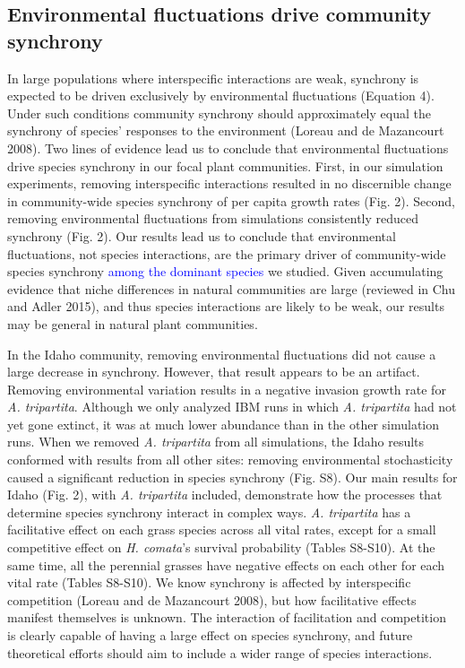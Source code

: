 \documentclass[12pt,]{article}
\begin{document}
\subsection{Environmental fluctuations drive community synchrony}

In large populations where interspecific interactions are weak,
synchrony is expected to be driven exclusively by environmental
fluctuations (Equation 4). Under such conditions community synchrony
should approximately equal the synchrony of species' responses to the
environment (Loreau and {{de Mazancourt}} 2008). Two lines of evidence
lead us to conclude that environmental fluctuations drive species
synchrony in our focal plant communities. First, in our simulation
experiments, removing interspecific interactions resulted in no
discernible change in community-wide species synchrony of per capita
growth rates (Fig. 2). Second, removing environmental fluctuations from
simulations consistently reduced synchrony (Fig. 2). Our results lead us
to conclude that environmental fluctuations, not species interactions,
are the primary driver of community-wide species synchrony
\textcolor{blue}{among the dominant species} we studied. Given
accumulating evidence that niche differences in natural communities are
large (reviewed in Chu and Adler 2015), and thus species interactions
are likely to be weak, our results may be general in natural plant
communities.

In the Idaho community, removing environmental fluctuations did not
cause a large decrease in synchrony. However, that result appears to be
an artifact. Removing environmental variation results in a negative
invasion growth rate for \emph{A. tripartita}. Although we only analyzed
IBM runs in which \emph{A. tripartita} had not yet gone extinct, it was
at much lower abundance than in the other simulation runs. When we
removed \emph{A. tripartita} from all simulations, the Idaho results
conformed with results from all other sites: removing environmental
stochasticity caused a significant reduction in species synchrony (Fig.
S8). Our main results for Idaho (Fig. 2), with \emph{A. tripartita}
included, demonstrate how the processes that determine species synchrony
interact in complex ways. \emph{A. tripartita} has a facilitative effect
on each grass species across all vital rates, except for a small
competitive effect on \emph{H. comata}'s survival probability (Tables
S8-S10). At the same time, all the perennial grasses have negative
effects on each other for each vital rate (Tables S8-S10). We know
synchrony is affected by interspecific competition (Loreau and {{de
Mazancourt}} 2008), but how facilitative effects manifest themselves is
unknown. The interaction of facilitation and competition is clearly
capable of having a large effect on species synchrony, and future
theoretical efforts should aim to include a wider range of species
interactions.
\end{document}
